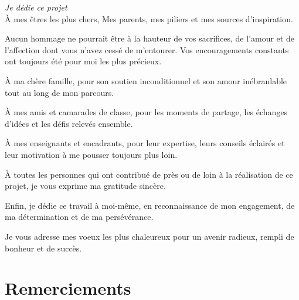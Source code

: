 \newpage
\thispagestyle{empty}
\vspace*{\fill}
\begin{center}

\renewcommand{\baselinestretch}{1.5}
\begin{large}
{\large \textit {Je dédie ce projet} \\
\setlength{\parskip}{20pt}
À mes êtres les plus chers,
\setlength{\parskip}{12pt}
Mes parents, mes piliers et mes sources d'inspiration.

\setlength{\parskip}{12pt}
Aucun hommage ne pourrait être à la hauteur de vos sacrifices, de l'amour
et de l'affection dont vous n'avez cessé de m'entourer. Vos encouragements
constants ont toujours été pour moi les plus précieux.

\setlength{\parskip}{12pt}
À ma chère famille, pour son soutien inconditionnel et son amour inébranlable tout au long de mon parcours.

\setlength{\parskip}{12pt}
À mes amis et camarades de classe, pour les moments de partage, les échanges d'idées et les défis relevés ensemble.

\setlength{\parskip}{12pt}
À mes enseignants et encadrants, pour leur expertise, leurs conseils éclairés et leur motivation à me pousser toujours plus loin.

\setlength{\parskip}{12pt}
À toutes les personnes qui ont contribué de près ou de loin à la réalisation de ce projet, je vous exprime ma gratitude sincère.

\setlength{\parskip}{12pt}
Enfin, je dédie ce travail à moi-même, en reconnaissance de mon engagement, de ma détermination et de ma persévérance.

\setlength{\parskip}{12pt}
Je vous adresse mes voeux les plus chaleureux pour un avenir radieux, rempli de bonheur et de succès.

}
\end{large}

\end{center}
\vspace*{\fill}


\newpage
\thispagestyle{empty}
\chapter*{Remerciements}

